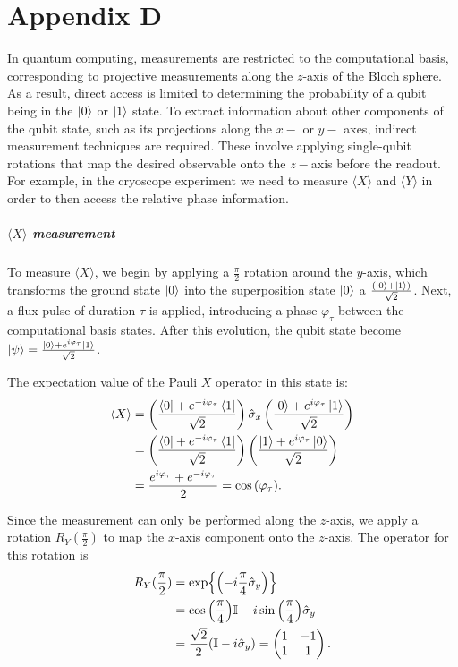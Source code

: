 \chapter*{Appendix D}
\label{app:AppendixD}

In quantum computing, measurements are restricted to the computational basis, corresponding to projective measurements along the $z$-axis of the Bloch sphere. 
As a result, direct access is limited to determining the probability of a qubit being in the $\ket{0}$ or $\ket{1}$ state.
To extract information about other components of the qubit state, such as its projections along the $x-$ or $y-$ axes, indirect measurement techniques are required. 
These involve applying single-qubit rotations that map the desired observable onto the $z-$axis before the readout.
For example, in the cryoscope experiment we need to measure $\langle X \rangle$ and $\langle Y \rangle$ in order to then access the relative phase information.
 
\paragraph{$\langle X \rangle$ measurement}
To measure $\langle X \rangle$, we begin by applying a $\frac{\pi}{2}$ rotation around the $y$-axis, which transforms the ground state $\ket{0}$ into the superposition state $\ket{0}$ a $\frac{(\ket{0} + \ket{1})}{\sqrt{2}}$.
Next, a flux pulse of duration $\tau$ is applied, introducing a phase $\varphi_\tau$ between the computational basis states. After this evolution, the qubit state become $\ket{\psi}=\frac{\ket{0} + e^{i\varphi_\tau} \ket{1}}{\sqrt{2}}$.

The expectation value of the Pauli $X$ operator in this state is:
\begin{align}
    \langle X \rangle &= \left( \frac{\bra{0} + e^{- i\varphi_\tau} \bra{1}}{\sqrt{2}} \right) \hat{\sigma}_x \left( \frac{\ket{0} + e^{ i \varphi_\tau} \ket{1}}{\sqrt{2}} \right)\\
    &= \left( \frac{\bra{0} + e^{- i \varphi_\tau} \bra{1}}{\sqrt{2}} \right)\left( \frac{\ket{1} + e^{ i \varphi_\tau} \ket{0}}{\sqrt{2}} \right)\\
    &= \frac{e^{ i \varphi_\tau} + e^{- i\varphi_\tau}}{2} = \cos{(\varphi_\tau)}.
\end{align}

Since the measurement can only be performed along the $z$-axis, we apply a rotation $R_Y(\frac{\pi}{2})$ to map the $x$-axis component onto the $z$-axis. The operator for this rotation is
\begin{align}\label{eq:RY90}
    R_Y(\frac{\pi}{2}) &= \exp{\left( -i\frac{\pi}{4}\hat{\sigma}_y\right)}\\
    &= \cos{\left(\frac{\pi}{4}\right)}\mathbb{I} - i\sin{\left(\frac{\pi}{4}\right)}\hat{\sigma}_y\\
    &= \frac{\sqrt{2}}{2}(\mathbb{I} -i\hat{\sigma}_y) = \begin{pmatrix}
        1 & -1 \\
        1 & 1
        \end{pmatrix}.
\end{align}

